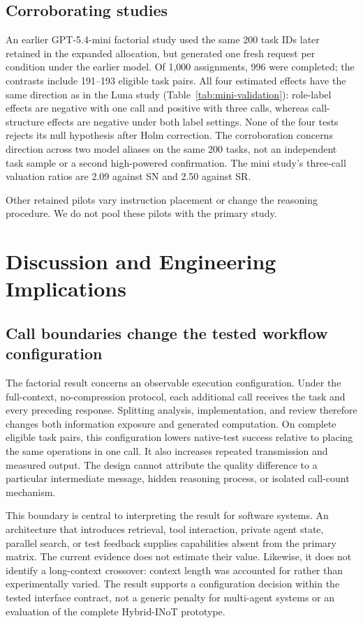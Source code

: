 


\subsection{Corroborating studies}
An earlier GPT-5.4-mini factorial study used the same 200 task IDs later retained in the expanded allocation, but generated one fresh request per condition under the earlier model. Of 1,000 assignments, 996 were completed; the contrasts include 191--193 eligible task pairs. All four estimated effects have the same direction as in the Luna study (Table~\ref{tab:mini-validation}): role-label effects are negative with one call and positive with three calls, whereas call-structure effects are negative under both label settings. None of the four tests rejects its null hypothesis after Holm correction. The corroboration concerns direction across two model aliases on the same 200 tasks, not an independent task sample or a second high-powered confirmation. The mini study's three-call valuation ratios are 2.09 against SN and 2.50 against SR.



Other retained pilots vary instruction placement or change the reasoning procedure. We do not pool these pilots with the primary study.



\section{Discussion and Engineering Implications}
\subsection{Call boundaries change the tested workflow configuration}
The factorial result concerns an observable execution configuration. Under the full-context, no-compression protocol, each additional call receives the task and every preceding response. Splitting analysis, implementation, and review therefore changes both information exposure and generated computation. On complete eligible task pairs, this configuration lowers native-test success relative to placing the same operations in one call. It also increases repeated transmission and measured output. The design cannot attribute the quality difference to a particular intermediate message, hidden reasoning process, or isolated call-count mechanism.

This boundary is central to interpreting the result for software systems. An architecture that introduces retrieval, tool interaction, private agent state, parallel search, or test feedback supplies capabilities absent from the primary matrix. The current evidence does not estimate their value. Likewise, it does not identify a long-context crossover: context length was accounted for rather than experimentally varied. The result supports a configuration decision within the tested interface contract, not a generic penalty for multi-agent systems or an evaluation of the complete Hybrid-INoT prototype.

